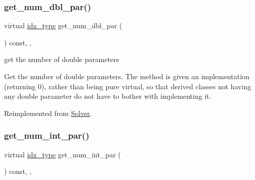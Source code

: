 \subsubsection{\texorpdfstring{get\+\_\+num\+\_\+dbl\+\_\+par()}{get\_num\_dbl\_par()}}
{\footnotesize\ttfamily virtual \mbox{\hyperlink{class_s_m_spp__di__unipi__it_1_1_thin_compute_interface_aa3d710629ad8c434286726ad810c3b47}{idx\+\_\+type}} get\+\_\+num\+\_\+dbl\+\_\+par (\begin{DoxyParamCaption}\item[{void}]{ }\end{DoxyParamCaption}) const\hspace{0.3cm}{\ttfamily [inline]}, {\ttfamily [override]}, {\ttfamily [virtual]}}



get the number of double parameters 

Get the number of double parameters. The method is given an implementation (returning 0), rather than being pure virtual, so that derived classes not having any double parameter do not have to bother with implementing it. 

Reimplemented from \mbox{\hyperlink{class_s_m_spp__di__unipi__it_1_1_solver_a842fd454acaded84baf6b77e0d61a950}{Solver}}.

\mbox{\label{class_s_m_spp__di__unipi__it_1_1_c_d_a_solver_a3ad74d9506761eb2ca4c8a936fb7a1c5}} 
\subsubsection{\texorpdfstring{get\+\_\+num\+\_\+int\+\_\+par()}{get\_num\_int\_par()}}
{\footnotesize\ttfamily virtual \mbox{\hyperlink{class_s_m_spp__di__unipi__it_1_1_thin_compute_interface_aa3d710629ad8c434286726ad810c3b47}{idx\+\_\+type}} get\+\_\+num\+\_\+int\+\_\+par (\begin{DoxyParamCaption}\item[{void}]{ }\end{DoxyParamCaption}) const\hspace{0.3cm}{\ttfamily [inline]}, {\ttfamily [override]}, {\ttfamily [virtual]}}




